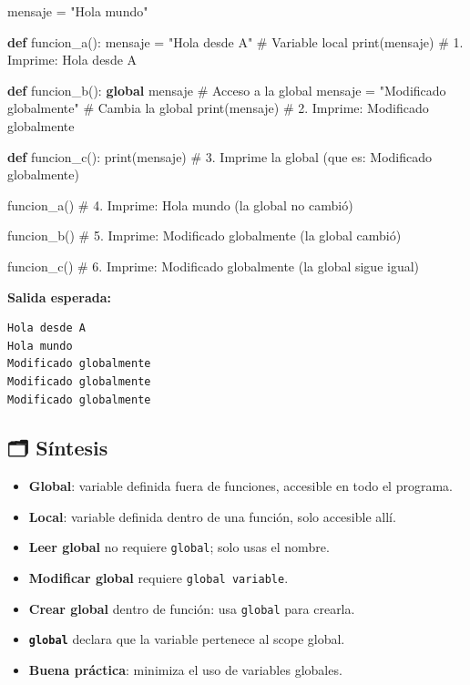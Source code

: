 \documentclass[
  doc,
  floatsintext,
  longtable,
  a4paper,
  nolmodern,
  notxfonts,
  notimes,
  12pt,
  colorlinks=true,linkcolor=blue,citecolor=blue,urlcolor=blue]{apa7}
\newenvironment{Shaded}{\begin{snugshade}}{\end{snugshade}}
\newcommand{\BuiltInTok}[1]{\textcolor[rgb]{0.00,0.23,0.31}{#1}}
\newcommand{\CommentTok}[1]{\textcolor[rgb]{0.37,0.37,0.37}{#1}}
\newcommand{\KeywordTok}[1]{\textcolor[rgb]{0.00,0.23,0.31}{\textbf{#1}}}
\newcommand{\NormalTok}[1]{\textcolor[rgb]{0.00,0.23,0.31}{#1}}
\newcommand{\OperatorTok}[1]{\textcolor[rgb]{0.37,0.37,0.37}{#1}}
\newcommand{\StringTok}[1]{\textcolor[rgb]{0.13,0.47,0.30}{#1}}
\providecommand{\tightlist}{%
  \setlength{\itemsep}{0pt}\setlength{\parskip}{0pt}}
\begin{document}
\begin{Shaded}
\begin{Highlighting}[]
\NormalTok{mensaje }\OperatorTok{=} \StringTok{"Hola mundo"}

\KeywordTok{def}\NormalTok{ funcion\_a():}
\NormalTok{    mensaje }\OperatorTok{=} \StringTok{"Hola desde A"}  \CommentTok{\# Variable local}
    \BuiltInTok{print}\NormalTok{(mensaje)  }\CommentTok{\# 1. Imprime: Hola desde A}

\KeywordTok{def}\NormalTok{ funcion\_b():}
    \KeywordTok{global}\NormalTok{ mensaje  }\CommentTok{\# Acceso a la global}
\NormalTok{    mensaje }\OperatorTok{=} \StringTok{"Modificado globalmente"}  \CommentTok{\# Cambia la global}
    \BuiltInTok{print}\NormalTok{(mensaje)  }\CommentTok{\# 2. Imprime: Modificado globalmente}

\KeywordTok{def}\NormalTok{ funcion\_c():}
    \BuiltInTok{print}\NormalTok{(mensaje)  }\CommentTok{\# 3. Imprime la global (que es: Modificado globalmente)}

\NormalTok{funcion\_a()}
\CommentTok{\# 4. Imprime: Hola mundo (la global no cambió)}

\NormalTok{funcion\_b()}
\CommentTok{\# 5. Imprime: Modificado globalmente (la global cambió)}

\NormalTok{funcion\_c()}
\CommentTok{\# 6. Imprime: Modificado globalmente (la global sigue igual)}
\end{Highlighting}
\end{Shaded}

\textbf{Salida esperada:}

\begin{verbatim}
Hola desde A
Hola mundo
Modificado globalmente
Modificado globalmente
Modificado globalmente
\end{verbatim}

\subsection{🗂️ Síntesis}\label{suxedntesis}

\begin{itemize}
\tightlist
\item
  \textbf{Global}: variable definida fuera de funciones, accesible en
  todo el programa.
\item
  \textbf{Local}: variable definida dentro de una función, solo
  accesible allí.
\item
  \textbf{Leer global} no requiere \texttt{global}; solo usas el nombre.
\item
  \textbf{Modificar global} requiere \texttt{global\ variable}.
\item
  \textbf{Crear global} dentro de función: usa \texttt{global} para
  crearla.
\item
  \textbf{\texttt{global}} declara que la variable pertenece al scope
  global.
\item
  \textbf{Buena práctica}: minimiza el uso de variables globales.
\end{itemize}
\end{document}
